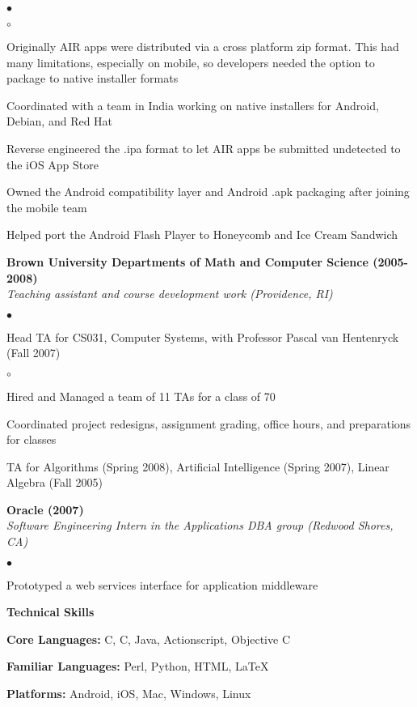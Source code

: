 \documentclass[ComputerScience]{vita}
\newcommand{\CPP}
{C\nolinebreak[4]\hspace{-.05em}\raisebox{.60ex}{\tiny\bf ++}}
\newenvironment{suber}[0]
{\begin{list}{$\bullet$}
	{\setlength{\topsep}{-0.4in}
		\setlength{\leftmargin}{0.25in}
		\setlength{\itemsep}{0.01in}}
}
{\end{list}\par}
\newenvironment{suberb}[0]
{\begin{list}{$\circ$}
	{\setlength{\topsep}{-0.4in}
		\setlength{\leftmargin}{0.25in}
		\setlength{\itemsep}{0.01in}}
}
{\end{list}\par}
\begin{document}
\begin{vita}
\begin{list}{}{\setlength{\leftmargin}{.25in}}
\begin{suber}
		\begin{suberb}
			\item Originally AIR apps were distributed via a cross platform zip format. This had many limitations, especially on mobile, so developers needed the option to package to native installer formats
			\item Coordinated with a team in India working on native installers for Android, Debian, and Red Hat
			\item Reverse engineered the .ipa format to let AIR apps be submitted undetected to the iOS App Store
		\end{suberb}
	\item Owned the Android compatibility layer and Android .apk packaging after joining the mobile team
	\item Helped port the Android Flash Player to Honeycomb and Ice Cream Sandwich 
    \end{suber}
    \item {\bf Brown University Departments of Math and Computer Science (2005-2008)}\\
    {\em Teaching assistant and course development work (Providence, RI)}
    \begin{suber}
	\item Head TA for CS031, Computer Systems, with Professor Pascal van Hentenryck (Fall 2007)
        \begin{suberb}
        	\item Hired and Managed a team of 11 TAs for a class of 70
		\item Coordinated project redesigns, assignment grading, office hours, and preparations for classes
        \end{suberb}
	\item TA for Algorithms (Spring 2008), Artificial Intelligence (Spring 2007), Linear Algebra (Fall 2005)
    \end{suber}
    \item {\bf Oracle (2007)}\\
    {\em Software Engineering Intern in the Applications DBA group (Redwood
    Shores, CA)}
    \begin{suber}
	\item Prototyped a web services interface for application middleware
    \end{suber}
\end{list}
{\bf{\large Technical Skills}}\ \hrulefill
\begin{list}{}{\setlength{\leftmargin}{.25in}}
	\item {\bf Core Languages:} C, \CPP, Java, Actionscript, Objective C
	\item {\bf Familiar Languages:} Perl, Python, HTML, \LaTeX{}
	\item {\bf Platforms:} Android, iOS, Mac, Windows, Linux
\end{list}
\end{vita}
\end{document}
